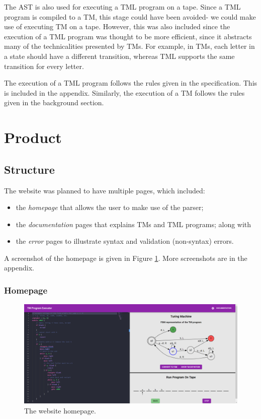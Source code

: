 The AST is also used for executing a TML program on a tape. Since a TML program is compiled to a TM, this stage could have been avoided- we could make use of executing TM on a tape. However, this was also included since the execution of a TML program was thought to be more efficient, since it abstracts many of the technicalities presented by TMs. For example, in TMs, each letter in a state should have a different transition, whereas TML supports the same transition for every letter.

The execution of a TML program follows the rules given in the specification. This is included in the appendix. Similarly, the execution of a TM follows the rules given in the background section.

\section{Product}
\subsection{Structure}
The website was planned to have multiple pages, which included:
\begin{itemize}
    \item the \emph{homepage} that allows the user to make use of the parser;
    \item the \emph{documentation} pages that explains TMs and TML programs; along with
    \item the \emph{error} pages to illustrate syntax and validation (non-syntax) errors.
\end{itemize}

A screenshot of the homepage is given in Figure \ref{fig:homepage_design}. More screenshots are in the appendix.

\subsubsection{Homepage}
\begin{figure}[htb]
    \centering
    \includegraphics[scale=0.18]{images/Homepage execution start.png}
    \caption{The website homepage.}
    \label{fig:homepage_design}
\end{figure}


